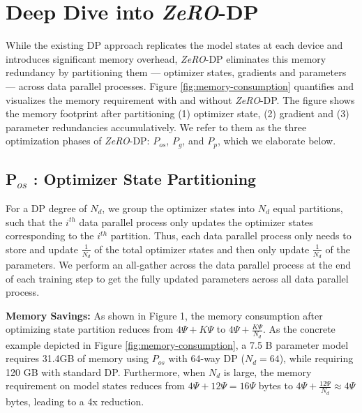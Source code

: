 \documentclass{article}
\newcommand{\name}{\emph{ZeRO}\xspace}
\begin{document}
\section{Deep Dive into \name-DP}\label{sec:memoryoptimization}
While the existing DP approach replicates the model states at each device and introduces significant memory overhead, \name-DP eliminates this memory redundancy by partitioning them --- optimizer states, gradients and parameters --- across data parallel processes.  
Figure \ref{fig:memory-consumption} quantifies and visualizes the memory requirement with and without \name-DP. The figure shows the memory footprint after partitioning (1) optimizer state, (2) gradient and (3) parameter redundancies accumulatively.  We refer to them as the three optimization phases of \name-DP: $P_{os}$, $P_g$, and $P_p$, which we elaborate below. 

\subsection{P$_{os}$ : Optimizer State Partitioning }\label{sec:pos}
For a DP degree of $N_d$, we group the optimizer states into $N_d$ equal partitions, such that the $i^{th}$ data parallel process only updates the optimizer states corresponding to the $i^{th}$ partition. Thus, each data parallel process only needs to store and update $\frac{1}{N_d}$ of the total optimizer states and then only update $\frac{1}{N_d}$ of the parameters.
We perform an all-gather across the data parallel process at the end of each training step to get the fully updated parameters across all data parallel process. 

\textbf{Memory Savings: } As shown in Figure 1, the memory consumption after optimizing state partition reduces from $4\Psi+K\Psi$ to $4\Psi + \frac{K\Psi}{N_d}$.  As the concrete example depicted in Figure \ref{fig:memory-consumption}, a 7.5 B parameter model requires 31.4GB of memory using $P_{os}$ with 64-way DP ($N_d = 64$), while requiring 120 GB with standard DP.
Furthermore, when $N_d$ is large, the memory requirement on model states reduces from $4\Psi+12\Psi=16\Psi$ bytes to $ 4 \Psi + \frac{12 \Psi}{N_d} \approx 4 \Psi$ bytes, leading to a 4x reduction. 
\end{document}
